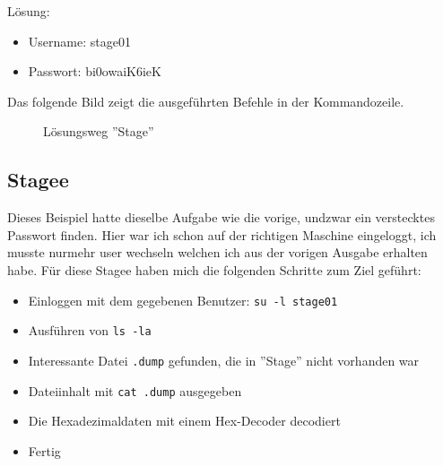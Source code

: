 \documentclass[12pt, a4paper, titlepage, oneside]{scrartcl}
\begin{document}
	Lösung:
	\begin{itemize}
		\item Username: stage01

		\item Passwort: bi0owaiK6ieK
	\end{itemize}
	Das folgende Bild zeigt die ausgeführten Befehle in der Kommandozeile.
	\begin{figure}[h!]
		\centering
		\caption{Lösungsweg ''Stage''}
		\label{fig:stage_solution}
	\end{figure}

	\newpage

	\subsection{Stagee}
	Dieses Beispiel hatte dieselbe Aufgabe wie die vorige, undzwar ein verstecktes
	Passwort finden. Hier war ich schon auf der richtigen Maschine eingeloggt, ich
	musste nurmehr user wechseln welchen ich aus der vorigen Ausgabe erhalten habe.
	Für diese Stagee haben mich die folgenden Schritte zum Ziel geführt:

	\begin{itemize}
		\item Einloggen mit dem gegebenen Benutzer: \lstinline{su -l stage01}

		\item Ausführen von \lstinline{ls -la}

		\item Interessante Datei \lstinline{.dump} gefunden, die in ''Stage'' nicht vorhanden
			war

		\item Dateiinhalt mit \lstinline{cat .dump} ausgegeben

		\item Die Hexadezimaldaten mit einem Hex-Decoder decodiert

		\item Fertig
	\end{itemize}
\end{document}
